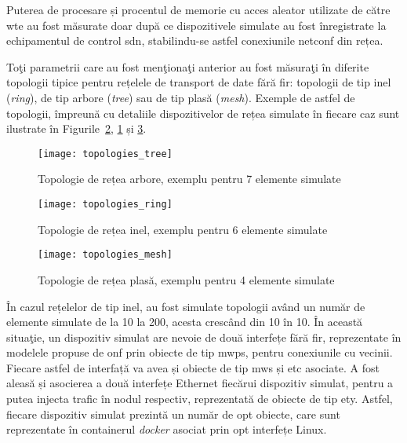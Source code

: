 Puterea de procesare și procentul de memorie cu acces aleator utilizate de către \gls{wte} au fost măsurate doar după ce dispozitivele simulate au fost înregistrate la echipamentul de control \gls{sdn}, stabilindu-se astfel conexiunile \gls{netconf} din rețea.

Toţi parametrii care au fost menţionaţi anterior au fost măsuraţi în diferite topologii tipice pentru rețelele de transport de date fără fir: topologii de tip inel (\textit{ring}), de tip arbore (\textit{tree}) sau de tip plasă (\textit{mesh}). Exemple de astfel de topologii, împreună cu detaliile dispozitivelor de rețea simulate în fiecare caz sunt ilustrate în Figurile~\ref{fig:topologies_ring}, \ref{fig:topologies_tree} și \ref{fig:topologies_mesh}.

\begin{figure}[h]
	\centering
	\texttt{[image: topologies\_tree]}
	\caption{Topologie de rețea arbore, exemplu pentru 7 elemente simulate}
	\label{fig:topologies_tree}
\end{figure}

\begin{figure}[h]
	\centering
	\texttt{[image: topologies\_ring]}
	\caption{Topologie de rețea inel, exemplu pentru 6 elemente simulate}
	\label{fig:topologies_ring}
\end{figure}

\begin{figure}[h]
	\centering
	\texttt{[image: topologies\_mesh]}
	\caption{Topologie de rețea plasă, exemplu pentru 4 elemente simulate}
	\label{fig:topologies_mesh}
\end{figure}

În cazul rețelelor de tip inel, au fost simulate topologii având un număr de elemente simulate de la 10 la 200, acesta crescând din 10 în 10. În această situaţie, un dispozitiv simulat are nevoie de două interfețe fără fir, reprezentate în modelele propuse de \gls{onf} prin obiecte de tip \gls{mwps}, pentru conexiunile cu vecinii. Fiecare astfel de interfață va avea și obiecte de tip \gls{mws} și \gls{etc} asociate. A fost aleasă și asocierea a două interfețe Ethernet fiecărui dispozitiv simulat, pentru a putea injecta trafic în nodul respectiv, reprezentată de obiecte de tip \gls{ety}. Astfel, fiecare dispozitiv simulat prezintă un număr de opt obiecte, care sunt reprezentate în containerul \textit{docker} asociat prin opt interfețe Linux.

